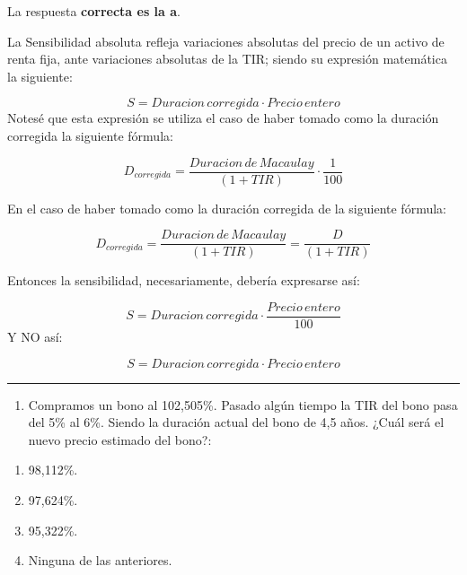 \documentclass[
  letterpaper,
  DIV=11,
  numbers=noendperiod]{scrartcl}
\providecommand{\tightlist}{%
  \setlength{\itemsep}{0pt}\setlength{\parskip}{0pt}}\usepackage{longtable,booktabs,array}
\begin{document}
\begin{tcolorbox}[enhanced jigsaw, colframe=quarto-callout-note-color-frame, opacityback=0, colback=white, leftrule=.75mm, left=2mm, breakable, arc=.35mm, rightrule=.15mm, toprule=.15mm, bottomrule=.15mm]
\begin{minipage}[t]{5.5mm}
\textcolor{quarto-callout-note-color}{\faInfo}
\end{minipage}%
\begin{minipage}[t]{\textwidth - 5.5mm}

La respuesta \textbf{correcta es la a}.

La Sensibilidad absoluta refleja variaciones absolutas del precio de un
activo de renta fija, ante variaciones absolutas de la TIR; siendo su
expresión matemática la siguiente:

\[S={Duracion\,corregida }\cdot{Precio\,entero}\] Notesé que esta
expresión se utiliza el caso de haber tomado como la duración corregida
la siguiente fórmula:

\[D_{corregida}=\frac{Duracion\,de\, Macaulay}{\left(1+TIR\right)}\cdot\frac{1}{100}\]

En el caso de haber tomado como la duración corregida de la siguiente
fórmula:

\[D_{corregida}=\frac{Duracion\,de\, Macaulay}{\left(1+TIR\right)}=\frac{D}{\left(1+TIR\right)} \]

Entonces la sensibilidad, necesariamente, debería expresarse así:

\[S= Duracion\,corregida \cdot \frac{Precio\,entero}{100}\] Y NO así:

\[S={Duracion\,corregida }\cdot{Precio\,entero}\]

\end{minipage}%
\end{tcolorbox}

\begin{center}\rule{0.5\linewidth}{0.5pt}\end{center}

\begin{enumerate}
\def\labelenumi{\arabic{enumi}.}
\setcounter{enumi}{19}
\tightlist
\item
  Compramos un bono al 102,505\%. Pasado algún tiempo la TIR del bono
  pasa del 5\% al 6\%. Siendo la duración actual del bono de 4,5 años.
  ¿Cuál será el nuevo precio estimado del bono?:
\end{enumerate}

\begin{enumerate}
\def\labelenumi{\alph{enumi}.}
\item
  98,112\%.
\item
  97,624\%.
\item
  95,322\%.
\item
  Ninguna de las anteriores.
\end{enumerate}
\end{document}
